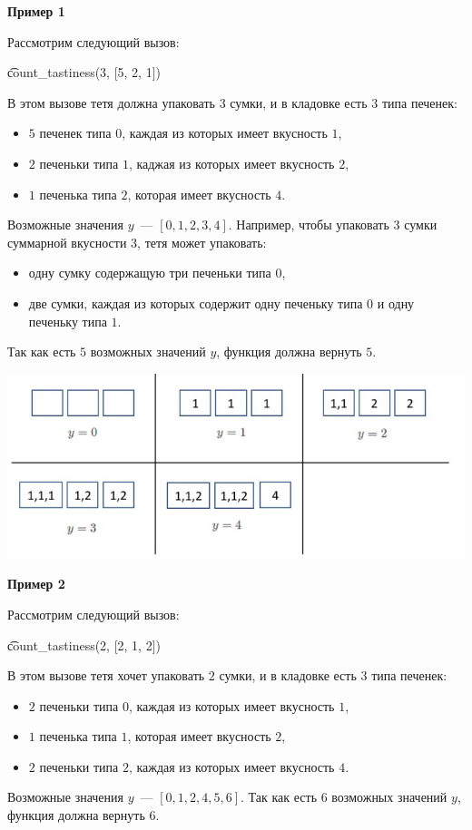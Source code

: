 \textbf{Пример 1}

Рассмотрим следующий вызов:

\t{count\_tastiness(3, [5, 2, 1])}

В этом вызове тетя должна упаковать $3$ сумки, и в кладовке есть $3$ типа печенек:
\begin{itemize}
\item $5$ печенек типа $0$, каждая из которых имеет вкусность $1$,
\item $2$ печеньки типа $1$, каджая из которых имеет вкусность $2$,
\item $1$ печенька типа $2$, которая имеет вкусность $4$.
\end{itemize}

Возможные значения $y$~--- $[0, 1, 2, 3, 4]$. Например, чтобы упаковать $3$ сумки суммарной вкусности $3$, тетя может упаковать:
\begin{itemize}
\item одну сумку содержащую три печеньки типа $0$,
\item две сумки, каждая из которых содержит одну печеньку типа $0$ и одну печеньку типа $1$.
\end{itemize}

Так как есть $5$ возможных значений $y$, функция должна вернуть $5$.

\includegraphics[scale=0.8]{1.png}
 
\textbf{Пример 2}

Рассмотрим следующий вызов:

\t{count\_tastiness(2, [2, 1, 2])}

В этом вызове тетя хочет упаковать $2$ сумки, и в кладовке есть $3$ типа печенек:
\begin{itemize}
\item $2$ печеньки типа $0$, каждая из которых имеет вкусность $1$,
\item $1$ печенька типа $1$, которая имеет вкусность $2$,
\item $2$ печеньки типа $2$, каждая из которых имеет вкусность $4$.
\end{itemize}
Возможные значения $y$~--- $[0,1,2,4,5,6]$. Так как есть $6$ возможных значений  $y$, функция должна вернуть $6$.